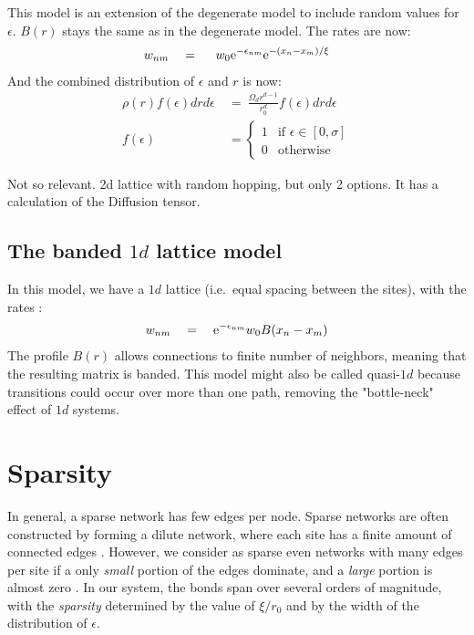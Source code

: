 This model is an extension of the degenerate model to include
random values for $\epsilon$. $B(r)$ stays the same as in the degenerate model.
The rates are now:
%
\begin{align}\label{eq:mott_hopping_rates}
w_{nm} \quad = \quad \ w_0 \mbox{e}^{-\epsilon_{nm}}\mbox{e}^{-(x_n-x_m)/\xi}
\end{align}
%
And the combined distribution of $\epsilon$ and $r$ is now:
%
\begin{align}\label{eq:mott_distribution}
\rho(r)f(\epsilon)drd\epsilon \ &=\ \frac{\Omega_d r^{d-1}}{r_0^d} f(\epsilon) dr d\epsilon \\
f(\epsilon)\ &= 
  \begin{cases} 
    1 &\textrm{if   } \epsilon \in [0,\sigma] \\
    0 &\textrm{otherwise}
  \end{cases}
\end{align}
%

Not so relevant. 2d lattice with random hopping, but only 2 options. It has a calculation of the Diffusion tensor.
\subsection{The banded $1d$ lattice model}

In this model, we have a $1d$ lattice (i.e.\ equal spacing between the sites), 
with the rates :
%
\begin{align}
w_{nm} \quad = \quad \mbox{e}^{-\epsilon_{nm}}w_0 B(x_n-x_m)
\end{align}
%
The profile $B(r)$ allows connections to finite number of neighbors,
meaning that the resulting matrix is banded. This model might also
be called quasi-$1d$ because transitions could occur over more
than one path, removing the "bottle-neck" effect of $1d$ systems.


\section{Sparsity}\label{sec:sparsity}

In general, a sparse network has few edges per node. Sparse networks 
are often constructed by forming a dilute network, where each site
has a finite amount of connected edges 
\cite{rodgers_density_1988,biroli_single_1999,fortin_asymptotic_2005,metz_localization_2010}.
However, we consider as sparse even networks with many edges per site
if a only \emph{small} portion of the edges dominate, and a \emph{large}
portion is almost zero \cite{cohen_energy_2012,stotland_semilinear_2009}. In our system, the bonds span
over several orders of magnitude, with the \emph{sparsity} 
determined by the value of $\xi/r_0$ and by the width of the distribution
of $\epsilon$.

